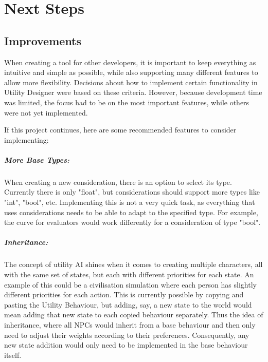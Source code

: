 \chapter{Next Steps}
\label{chap:nextsteps}
\section{Improvements}
\label{sec:nextsteps_improvements}

When creating a tool for other developers, it is important to keep everything as intuitive and simple as possible, while also supporting many different features to allow more flexibility. Decisions about how to implement certain functionality in Utility Designer were based on these criteria. However, because development time was limited, the focus had to be on the most important features, while others were not yet implemented.

If this project continues, here are some recommended features to consider implementing:

\paragraph{More Base Types:}
When creating a new consideration, there is an option to select its type. Currently there is only "float", but considerations should support more types like "int", "bool", etc. Implementing this is not a very quick task, as everything that uses considerations needs to be able to adapt to the specified type. For example, the curve for evaluators would work differently for a consideration of type "bool".

\paragraph{Inheritance:}
The concept of utility AI shines when it comes to creating multiple characters, all with the same set of states, but each with different priorities for each state. An example of this could be a civilisation simulation where each person has slightly different priorities for each action. This is currently possible by copying and pasting the Utility Behaviour, but adding, say, a new state to the world would mean adding that new state to each copied behaviour separately. Thus the idea of inheritance, where all NPCs would inherit from a base behaviour and then only need to adjust their weights according to their preferences. Consequently, any new state addition would only need to be implemented in the base behaviour itself.

